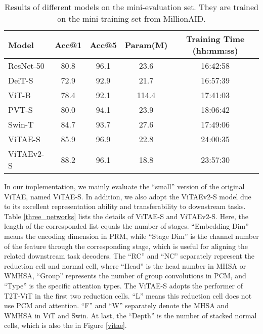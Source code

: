 \documentclass[10pt, journal,twoside]{IEEEtran}
\begin{document}
\begin{table*}[t]
  \scriptsize
  \caption{Results of different models on the mini-evaluation set. They are trained on the mini-training set from MillionAID.}
  \newcommand{\tabincell}[2]{\begin{tabular}{@{}#1@{}}#2\end{tabular}}
  \centering
  \begin{tabular}{l|c|c|c|c}
  \hline
  Model & Acc@1 & Acc@5 & Param(M) & Training Time (hh:mm:ss) \\ 
  \hline
  ResNet-50 \cite{resnet} & 80.8 & 96.1 & 23.6 & 16:42:58 \\
  DeiT-S \cite{deit} & 72.9 &  92.9 & 21.7 & 16:57:39 \\
  ViT-B \cite{vit} & 78.4 & 92.1 & 114.4 & 17:41:03 \\
  PVT-S \cite{pvt} & 80.0 & 94.1 & 23.9 & 18:06:42 \\
  Swin-T \cite{swint} & 84.7 & 93.7 & 27.6 & 17:49:06 \\
  ViTAE-S \cite{xu2021vitae} & 85.9 & 96.9 & 22.8 & 24:00:35 \\
  ViTAEv2-S \cite{vitae_v2} & 88.2 & 96.1 & 18.8 & 23:57:30 \\ 
  \hline
\end{tabular}
\label{model_select}
\end{table*}


In our implementation, we mainly evaluate the ``small'' version of the original ViTAE, named ViTAE-S. In addition, we also adopt the ViTAEv2-S model due to its excellent representation ability and transferability to downstream tasks. Table \ref{three_networks} lists the details of ViTAE-S and ViTAEv2-S. Here, the length of the corresponded list equals the number of stages. ``Embedding Dim'' means the encoding dimension in PRM, while ``Stage Dim'' is the channel number of the feature through the corresponding stage, which is useful for aligning the related downstream task decoders. The ``RC'' and ``NC'' separately represent the reduction cell and normal cell, where ``Head'' is the head number in MHSA or WMHSA, ``Group'' represents the number of group convolutions in PCM, and ``Type'' is the specific attention types. The ViTAE-S adopts the performer of T2T-ViT \cite{t2tvit} in the first two reduction cells. ``L'' means this reduction cell does not use PCM and attention. ``F'' and ``W'' separately denote the MHSA and WMHSA in ViT and Swin. At last, the ``Depth'' is the number of stacked normal cells, which is also the  in Figure \ref{vitae}.
\end{document}
